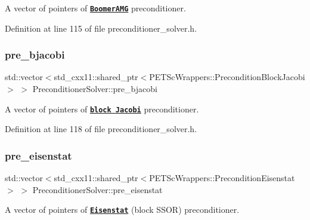 A vector of pointers of \href{https://www.dealii.org/8.5.0/doxygen/deal.II/classPETScWrappers_1_1PreconditionBoomerAMG.html}{\tt {\bfseries Boomer\+A\+MG}} preconditioner. 



Definition at line 115 of file preconditioner\+\_\+solver.\+h.

\mbox{\label{class_preconditioner_solver_af3d0217e39b9527c67ac6ce56464f11a}} 
\subsubsection{\texorpdfstring{pre\+\_\+bjacobi}{pre\_bjacobi}}
{\footnotesize\ttfamily std\+::vector$<$std\+\_\+cxx11\+::shared\+\_\+ptr$<$P\+E\+T\+Sc\+Wrappers\+::\+Precondition\+Block\+Jacobi$>$ $>$ Preconditioner\+Solver\+::pre\+\_\+bjacobi\hspace{0.3cm}{\ttfamily [private]}}



A vector of pointers of \href{https://www.dealii.org/8.5.0/doxygen/deal.II/classPETScWrappers_1_1PreconditionBlockJacobi.html}{\tt {\bfseries block Jacobi}} preconditioner. 



Definition at line 118 of file preconditioner\+\_\+solver.\+h.

\mbox{\label{class_preconditioner_solver_aab4bd157aebca7681283ff6cf0e69392}} 
\subsubsection{\texorpdfstring{pre\+\_\+eisenstat}{pre\_eisenstat}}
{\footnotesize\ttfamily std\+::vector$<$std\+\_\+cxx11\+::shared\+\_\+ptr$<$P\+E\+T\+Sc\+Wrappers\+::\+Precondition\+Eisenstat$>$ $>$ Preconditioner\+Solver\+::pre\+\_\+eisenstat\hspace{0.3cm}{\ttfamily [private]}}



A vector of pointers of \href{https://www.dealii.org/8.5.0/doxygen/deal.II/classPETScWrappers_1_1PreconditionEisenstat.html}{\tt {\bfseries Eisenstat}} (block S\+S\+OR) preconditioner. 




